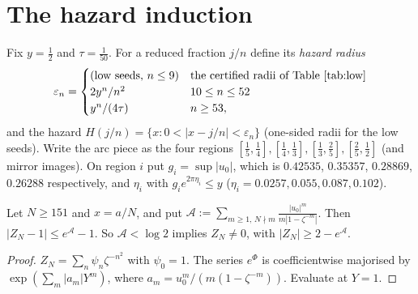\documentclass[11pt]{article}
\theoremstyle{definition}\newtheorem{definition}[theorem]{Definition}
\theoremstyle{remark}\newtheorem{remark}[theorem]{Remark}
\begin{document}
\section{The hazard induction}\label{sec:M}
Fix $y=\frac12$ and $\tau=\frac1{50}$. For a reduced fraction $j/n$ define its \emph{hazard radius}
\[\varepsilon_n=\begin{cases}\text{(low seeds, $n\le9$)}&\text{the certified radii of Table~\ref{tab:low}}\\ 2y^n/n^2&10\le n\le52\\ y^n/(4\tau)&n\ge53,\end{cases}\]
and the hazard $H(j/n)=\{x:0<|x-j/n|<\varepsilon_n\}$ (one-sided radii for the low seeds).
Write the arc piece as the four regions $[\frac15,\frac14],[\frac14,\frac13],[\frac13,\frac25],[\frac25,\frac12]$ (and mirror images). On region $i$ put $g_i=\sup|u_0|$, which is $0.42535$, $0.35357$, $0.28869$, $0.26288$ respectively, and $\eta_i$ with $g_ie^{2\pi\eta_i}\le y$ ($\eta_i=0.0257,0.055,0.087,0.102$).

\begin{lemma}\label{lem:A}
Let $N\ge151$ and $x=a/N$, and put $\mathcal A:=\sum_{m\ge1,\,N\nmid m}\frac{|u_0|^m}{m|1-\zeta^{-m}|}$. Then $|Z_N-1|\le e^{\mathcal A}-1$. So $\mathcal A<\log2$ implies $Z_N\ne0$, with $|Z_N|\ge2-e^{\mathcal A}$.
\end{lemma}
\begin{proof}
$Z_N=\sum_n\psi_n\zeta^{-n^2}$ with $\psi_0=1$. The series $e^{\Phi}$ is coefficientwise majorised by $\exp(\sum_m|a_m|Y^m)$, where $a_m=u_0^m/(m(1-\zeta^{-m}))$. Evaluate at $Y=1$.
\end{proof}
\end{document}

